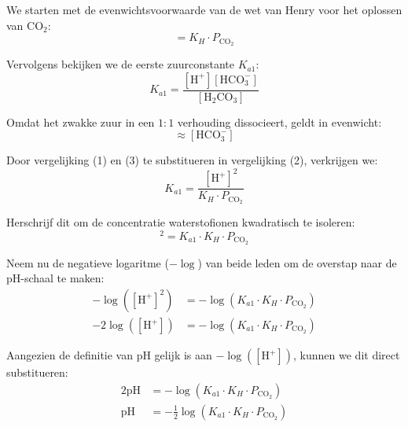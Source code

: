 \documentclass{article}
\begin{document}
We starten met de evenwichtsvoorwaarde van de wet van Henry voor het oplossen van $\text{CO}_2$:
\begin{equation}
    [\text{H}_2\text{CO}_3] = K_H \cdot P_{\text{CO}_2}
\end{equation}

Vervolgens bekijken we de eerste zuurconstante $K_{a1}$:
\begin{equation}
    K_{a1} = \frac{[\text{H}^+][\text{HCO}_3^-]}{[\text{H}_2\text{CO}_3]}
\end{equation}

Omdat het zwakke zuur in een $1:1$ verhouding dissocieert, geldt in evenwicht:
\begin{equation}
    [\text{H}^+] \approx [\text{HCO}_3^-]
\end{equation}

Door vergelijking (1) en (3) te substitueren in vergelijking (2), verkrijgen we:
\begin{equation}
    K_{a1} = \frac{[\text{H}^+]^2}{K_H \cdot P_{\text{CO}_2}}
\end{equation}

Herschrijf dit om de concentratie waterstofionen kwadratisch te isoleren:
\begin{equation}
    [\text{H}^+]^2 = K_{a1} \cdot K_H \cdot P_{\text{CO}_2}
\end{equation}

Neem nu de negatieve logaritme ($-\log$) van beide leden om de overstap naar de pH-schaal te maken:
\begin{align*}
    -\log\left([\text{H}^+]^2\right) &= -\log(K_{a1} \cdot K_H \cdot P_{\text{CO}_2}) \\
    -2\log([\text{H}^+]) &= -\log(K_{a1} \cdot K_H \cdot P_{\text{CO}_2}) 
\end{align*}

Aangezien de definitie van pH gelijk is aan $-\log([\text{H}^+])$, kunnen we dit direct substitueren:
\begin{align*}
    2\text{pH} &= -\log(K_{a1} \cdot K_H \cdot P_{\text{CO}_2}) \\
    \text{pH} &= -\frac{1}{2}\log(K_{a1} \cdot K_H \cdot P_{\text{CO}_2})
\end{align*}
\end{document}
